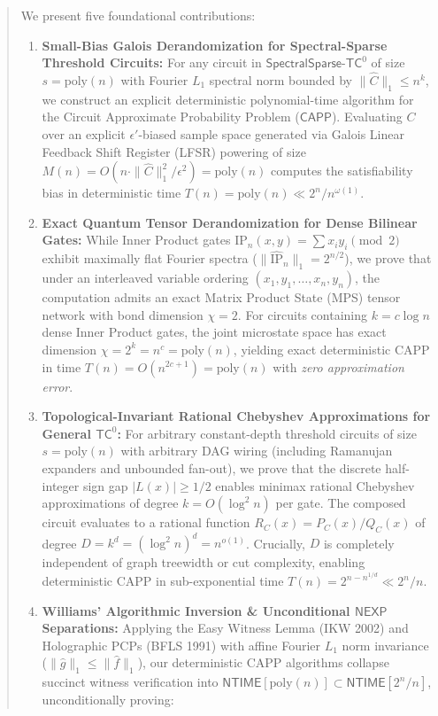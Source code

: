 \documentclass[11pt,a4paper]{article}
\theoremstyle{definition}
\theoremstyle{remark}
\newcommand{\NEXP}{\mathsf{NEXP}}
\newcommand{\TC}{\mathsf{TC}}
\newcommand{\NTIME}{\mathsf{NTIME}}
\newcommand{\poly}{\mathrm{poly}}
\newcommand{\CAPP}{\mathsf{CAPP}}
\newcommand{\SparseTC}{\mathsf{SpectralSparse}\text{-}\mathsf{TC}^0}
\newcommand{\IP}{\mathrm{IP}}
\begin{document}
\begin{abstract}
We present five foundational contributions:
\begin{enumerate}
    \item \textbf{Small-Bias Galois Derandomization for Spectral-Sparse Threshold Circuits:} For any circuit in $\SparseTC$ of size $s = \poly(n)$ with Fourier $L_1$ spectral norm bounded by $\|\hat{C}\|_1 \le n^k$, we construct an explicit deterministic polynomial-time algorithm for the Circuit Approximate Probability Problem ($\CAPP$). Evaluating $C$ over an explicit $\epsilon'$-biased sample space generated via Galois Linear Feedback Shift Register (LFSR) powering of size $M(n) = O(n \cdot \|\hat{C}\|_1^2 / \epsilon^2) = \poly(n)$ computes the satisfiability bias in deterministic time $T(n) = \poly(n) \ll 2^n / n^{\omega(1)}$.
    \item \textbf{Exact Quantum Tensor Derandomization for Dense Bilinear Gates:} While Inner Product gates $\IP_n(x, y) = \sum x_i y_i \pmod 2$ exhibit maximally flat Fourier spectra ($\|\widehat{\IP}_n\|_1 = 2^{n/2}$), we prove that under an interleaved variable ordering $(x_1, y_1, \dots, x_n, y_n)$, the computation admits an exact Matrix Product State (MPS) tensor network with bond dimension $\chi = 2$. For circuits containing $k = c \log n$ dense Inner Product gates, the joint microstate space has exact dimension $\chi = 2^k = n^c = \poly(n)$, yielding exact deterministic CAPP in time $T(n) = O(n^{2c+1}) = \poly(n)$ with \emph{zero approximation error}.
    \item \textbf{Topological-Invariant Rational Chebyshev Approximations for General $\TC^0$:} For arbitrary constant-depth threshold circuits of size $s = \poly(n)$ with arbitrary DAG wiring (including Ramanujan expanders and unbounded fan-out), we prove that the discrete half-integer sign gap $|L(x)| \ge 1/2$ enables minimax rational Chebyshev approximations of degree $k = O(\log^2 n)$ per gate. The composed circuit evaluates to a rational function $R_C(x) = P_C(x) / Q_C(x)$ of degree $D = k^d = (\log^2 n)^d = n^{o(1)}$. Crucially, $D$ is completely independent of graph treewidth or cut complexity, enabling deterministic CAPP in sub-exponential time $T(n) = 2^{n - n^{1/d}} \ll 2^n / n$.
    \item \textbf{Williams' Algorithmic Inversion \& Unconditional $\NEXP$ Separations:} Applying the Easy Witness Lemma (IKW 2002) and Holographic PCPs (BFLS 1991) with affine Fourier $L_1$ norm invariance ($\|\hat{g}\|_1 \le \|\hat{f}\|_1$), our deterministic CAPP algorithms collapse succinct witness verification into $\NTIME[\poly(n)] \subset \NTIME[2^n/n]$, unconditionally proving:

\end{enumerate}
\end{abstract}
\end{document}
